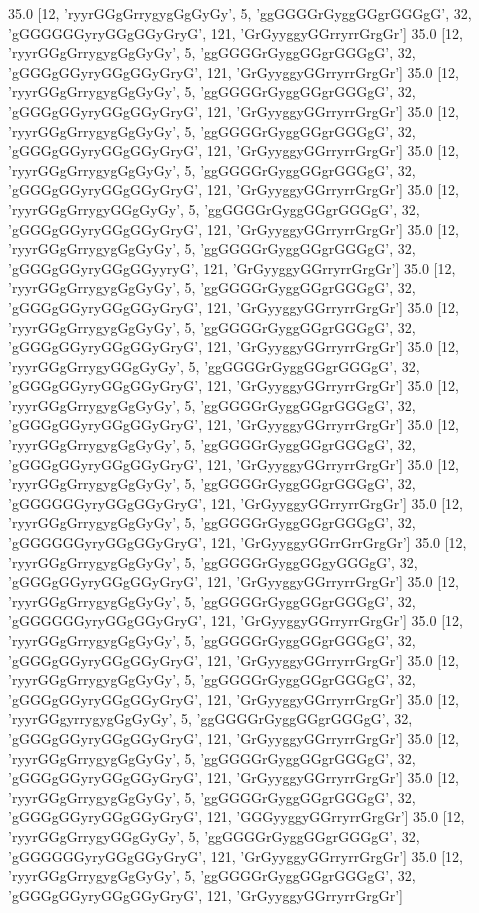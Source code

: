 35.0 [12, 'ryyrGGgGrrygygGgGyGy', 5, 'ggGGGGrGyggGGgrGGGgG', 32, 'gGGGGGGyryGGgGGyGryG', 121, 'GrGyyggyGGrryrrGrgGr']
35.0 [12, 'ryyrGGgGrrygygGgGyGy', 5, 'ggGGGGrGyggGGgrGGGgG', 32, 'gGGGgGGyryGGgGGyGryG', 121, 'GrGyyggyGGrryrrGrgGr']
35.0 [12, 'ryyrGGgGrrygygGgGyGy', 5, 'ggGGGGrGyggGGgrGGGgG', 32, 'gGGGgGGyryGGgGGyGryG', 121, 'GrGyyggyGGrryrrGrgGr']
35.0 [12, 'ryyrGGgGrrygygGgGyGy', 5, 'ggGGGGrGyggGGgrGGGgG', 32, 'gGGGgGGyryGGgGGyGryG', 121, 'GrGyyggyGGrryrrGrgGr']
35.0 [12, 'ryyrGGgGrrygygGgGyGy', 5, 'ggGGGGrGyggGGgrGGGgG', 32, 'gGGGgGGyryGGgGGyGryG', 121, 'GrGyyggyGGrryrrGrgGr']
35.0 [12, 'ryyrGGgGrrygyGGgGyGy', 5, 'ggGGGGrGyggGGgrGGGgG', 32, 'gGGGgGGyryGGgGGyGryG', 121, 'GrGyyggyGGrryrrGrgGr']
35.0 [12, 'ryyrGGgGrrygygGgGyGy', 5, 'ggGGGGrGyggGGgrGGGgG', 32, 'gGGGgGGyryGGgGGyyryG', 121, 'GrGyyggyGGrryrrGrgGr']
35.0 [12, 'ryyrGGgGrrygygGgGyGy', 5, 'ggGGGGrGyggGGgrGGGgG', 32, 'gGGGgGGyryGGgGGyGryG', 121, 'GrGyyggyGGrryrrGrgGr']
35.0 [12, 'ryyrGGgGrrygygGgGyGy', 5, 'ggGGGGrGyggGGgrGGGgG', 32, 'gGGGgGGyryGGgGGyGryG', 121, 'GrGyyggyGGrryrrGrgGr']
35.0 [12, 'ryyrGGgGrrygyGGgGyGy', 5, 'ggGGGGrGyggGGgrGGGgG', 32, 'gGGGgGGyryGGgGGyGryG', 121, 'GrGyyggyGGrryrrGrgGr']
35.0 [12, 'ryyrGGgGrrygygGgGyGy', 5, 'ggGGGGrGyggGGgrGGGgG', 32, 'gGGGgGGyryGGgGGyGryG', 121, 'GrGyyggyGGrryrrGrgGr']
35.0 [12, 'ryyrGGgGrrygygGgGyGy', 5, 'ggGGGGrGyggGGgrGGGgG', 32, 'gGGGgGGyryGGgGGyGryG', 121, 'GrGyyggyGGrryrrGrgGr']
35.0 [12, 'ryyrGGgGrrygygGgGyGy', 5, 'ggGGGGrGyggGGgrGGGgG', 32, 'gGGGGGGyryGGgGGyGryG', 121, 'GrGyyggyGGrryrrGrgGr']
35.0 [12, 'ryyrGGgGrrygygGgGyGy', 5, 'ggGGGGrGyggGGgrGGGgG', 32, 'gGGGGGGyryGGgGGyGryG', 121, 'GrGyyggyGGrrGrrGrgGr']
35.0 [12, 'ryyrGGgGrrygygGgGyGy', 5, 'ggGGGGrGyggGGgyGGGgG', 32, 'gGGGgGGyryGGgGGyGryG', 121, 'GrGyyggyGGrryrrGrgGr']
35.0 [12, 'ryyrGGgGrrygygGgGyGy', 5, 'ggGGGGrGyggGGgrGGGgG', 32, 'gGGGGGGyryGGgGGyGryG', 121, 'GrGyyggyGGrryrrGrgGr']
35.0 [12, 'ryyrGGgGrrygygGgGyGy', 5, 'ggGGGGrGyggGGgrGGGgG', 32, 'gGGGgGGyryGGgGGyGryG', 121, 'GrGyyggyGGrryrrGrgGr']
35.0 [12, 'ryyrGGgGrrygygGgGyGy', 5, 'ggGGGGrGyggGGgrGGGgG', 32, 'gGGGgGGyryGGgGGyGryG', 121, 'GrGyyggyGGrryrrGrgGr']
35.0 [12, 'ryyrGGgyrrygygGgGyGy', 5, 'ggGGGGrGyggGGgrGGGgG', 32, 'gGGGgGGyryGGgGGyGryG', 121, 'GrGyyggyGGrryrrGrgGr']
35.0 [12, 'ryyrGGgGrrygygGgGyGy', 5, 'ggGGGGrGyggGGgrGGGgG', 32, 'gGGGgGGyryGGgGGyGryG', 121, 'GrGyyggyGGrryrrGrgGr']
35.0 [12, 'ryyrGGgGrrygygGgGyGy', 5, 'ggGGGGrGyggGGgrGGGgG', 32, 'gGGGgGGyryGGgGGyGryG', 121, 'GGGyyggyGGrryrrGrgGr']
35.0 [12, 'ryyrGGgGrrygyGGgGyGy', 5, 'ggGGGGrGyggGGgrGGGgG', 32, 'gGGGGGGyryGGgGGyGryG', 121, 'GrGyyggyGGrryrrGrgGr']
35.0 [12, 'ryyrGGgGrrygygGgGyGy', 5, 'ggGGGGrGyggGGgrGGGgG', 32, 'gGGGgGGyryGGgGGyGryG', 121, 'GrGyyggyGGrryrrGrgGr']
